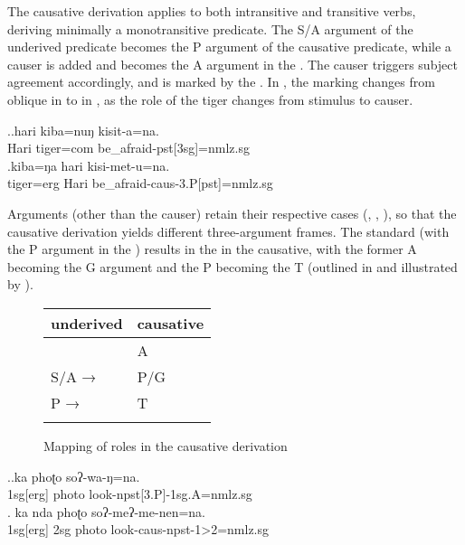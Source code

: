 The causative derivation applies to both intransitive and transitive verbs, deriving minimally a monotransitive predicate. The S/A argument of the underived predicate becomes the P argument of the cau\-sa\-tive predicate, while a causer is added and becomes the A argument in the . The causer triggers  subject agreement accordingly, and is marked by the  . In \Next, the  marking changes from oblique in \Next[a] to  in \Next[b], as the role of the tiger changes from stimulus to causer.

\ex.\ag.hari kiba=nuŋ kisit-a=na.\\
Hari tiger{\sc =com} be\_afraid{\sc -pst[3sg]=nmlz.sg}\\
\bg.kiba=ŋa hari kisi-met-u=na.\\
tiger{\sc =erg} Hari be\_afraid{\sc -caus-3.P[pst]=nmlz.sg}\\


Arguments (other than the causer) retain their respective cases (, , ), so that the causative derivation yields different three-argument frames. The standard  (with the P argument in the ) results in the  in the causative, with the former A becoming the G argument and the P becoming the T (outlined in  and illustrated by \Next). 

\begin{figure}[t]
\begin{center}
{\small
\begin{tabular}{ll}
\lsptoprule
{\sc underived}&{\sc causative} \\
\midrule
& A\\
S/A →&P/G \\
P →& T\\

\lspbottomrule
\end{tabular}
}
\end{center}
\caption{Mapping of roles in the causative derivation}\label{fig-caus}
\end{figure}
 
 

 
\ex.\ag.ka phoʈo soʔ-wa-ŋ=na.\\
{\sc 1sg[erg]} photo look{\sc -npst[3.P]-1sg.A=nmlz.sg}\\
\bg. ka nda phoʈo soʔ-meʔ-me-nen=na.\\
{\sc 1sg[erg]} {\sc 2sg} photo look{\sc -caus-npst-1>2=nmlz.sg}\\
 
